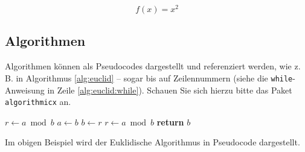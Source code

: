 \begin{equation}
f(x)=x^2
\label{eqn:e2}
\end{equation}

\subsection{Algorithmen}
Algorithmen können als Pseudocodes dargestellt und referenziert werden, wie z.\,B. in Algorithmus \vref{alg:euclid} -- 
sogar bis auf Zeilennummern (siehe die \texttt{while}-Anweisung in Zeile \vref{alg:euclid:while}). Schauen Sie sich hierzu bitte das 
Paket \texttt{algorithmicx} an.

\begin{algorithm}[H]
\begin{algorithmic}[1]
   \State $r\gets a\bmod b$
    \label{alg:euclid:while}
      \State $a\gets b$
      \State $b\gets r$
      \State $r\gets a\bmod b$
   \EndWhile\label{euclidendwhile}
   \State \textbf{return} $b$
\EndProcedure
\end{algorithmic}
\caption{Euklidischer Algorithmus}\label{alg:euclid}
\end{algorithm}

Im obigen Beispiel wird der Euklidische Algorithmus in Pseudocode dargestellt. 
